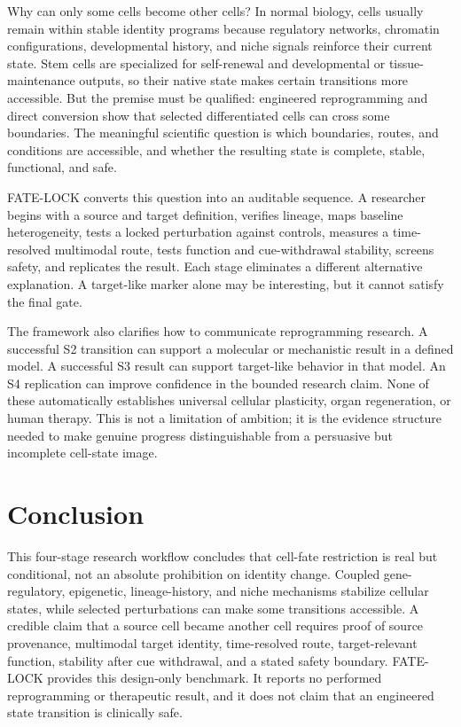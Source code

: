 \documentclass[10pt,conference]{IEEEtran}
\begin{document}
Why can only some cells become other cells? In normal biology, cells usually remain within stable identity programs because regulatory networks, chromatin configurations, developmental history, and niche signals reinforce their current state. Stem cells are specialized for self-renewal and developmental or tissue-maintenance outputs, so their native state makes certain transitions more accessible. But the premise must be qualified: engineered reprogramming and direct conversion show that selected differentiated cells can cross some boundaries. The meaningful scientific question is which boundaries, routes, and conditions are accessible, and whether the resulting state is complete, stable, functional, and safe.

FATE-LOCK converts this question into an auditable sequence. A researcher begins with a source and target definition, verifies lineage, maps baseline heterogeneity, tests a locked perturbation against controls, measures a time-resolved multimodal route, tests function and cue-withdrawal stability, screens safety, and replicates the result. Each stage eliminates a different alternative explanation. A target-like marker alone may be interesting, but it cannot satisfy the final gate.

The framework also clarifies how to communicate reprogramming research. A successful S2 transition can support a molecular or mechanistic result in a defined model. A successful S3 result can support target-like behavior in that model. An S4 replication can improve confidence in the bounded research claim. None of these automatically establishes universal cellular plasticity, organ regeneration, or human therapy. This is not a limitation of ambition; it is the evidence structure needed to make genuine progress distinguishable from a persuasive but incomplete cell-state image.

\section{Conclusion}
\label{sec:conclusion}

This four-stage research workflow concludes that cell-fate restriction is real but conditional, not an absolute prohibition on identity change. Coupled gene-regulatory, epigenetic, lineage-history, and niche mechanisms stabilize cellular states, while selected perturbations can make some transitions accessible. A credible claim that a source cell became another cell requires proof of source provenance, multimodal target identity, time-resolved route, target-relevant function, stability after cue withdrawal, and a stated safety boundary. FATE-LOCK provides this design-only benchmark. It reports no performed reprogramming or therapeutic result, and it does not claim that an engineered state transition is clinically safe.
\end{document}
